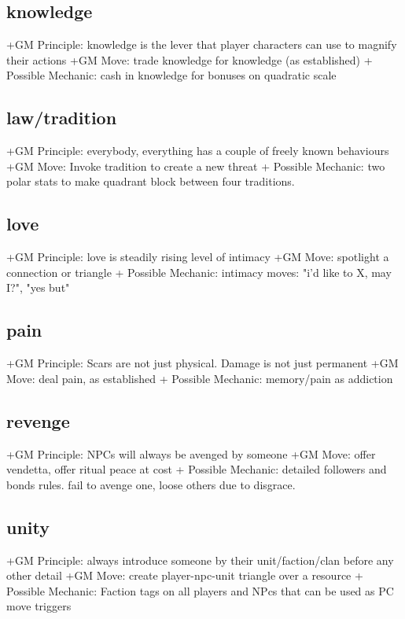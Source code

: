 \documentclass{tufte-handout}
\begin{document}
\begin{multicols}{2}
\subsection{knowledge }
+GM Principle: knowledge is the lever that player characters can use to magnify their actions	
+GM Move: trade knowledge for knowledge (as established)
+ Possible Mechanic: cash in knowledge for bonuses on quadratic scale

\subsection{law/tradition}
+GM Principle: everybody, everything has a couple of freely known behaviours
+GM Move: Invoke tradition to create a new threat
+ Possible Mechanic: two polar stats to make quadrant block between four traditions. 

\subsection{love}
+GM Principle:  love is steadily rising level of intimacy
+GM Move: spotlight a connection or triangle
+ Possible Mechanic: intimacy moves: 	 "i'd like to X, may I?", "yes but"

\subsection{pain}
+GM Principle: Scars are not just physical. Damage is not just permanent
+GM Move: deal pain, as established
+ Possible Mechanic: memory/pain as addiction 

\subsection{revenge}

+GM Principle: NPCs will always be avenged by someone
+GM Move:  offer vendetta, offer ritual peace at cost
+ Possible Mechanic: detailed followers and bonds rules. fail to avenge one, loose others due to disgrace.

\subsection{unity}
+GM Principle: always introduce someone by their unit/faction/clan before any other detail	
+GM Move: create player-npc-unit triangle over a resource 	
+ Possible Mechanic: Faction tags on all players and NPcs that can be used as PC move triggers



\end{multicols}
\end{document}
